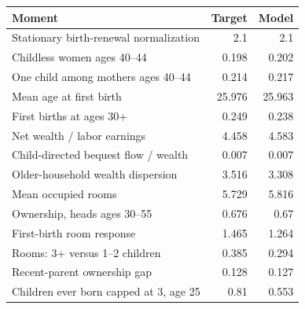 \begingroup\footnotesize
\setlength{\tabcolsep}{3pt}
\renewcommand{\arraystretch}{1.04}
\begin{tabularx}{\linewidth}{Xrr}
\toprule
Moment & Target & Model \\
\midrule
Stationary birth-renewal normalization & 2.1 & 2.1 \\
Childless women ages 40–44 & 0.198 & 0.202 \\
One child among mothers ages 40–44 & 0.214 & 0.217 \\
Mean age at first birth & 25.976 & 25.963 \\
First births at ages 30+ & 0.249 & 0.238 \\
Net wealth / labor earnings & 4.458 & 4.583 \\
Child-directed bequest flow / wealth & 0.007 & 0.007 \\
Older-household wealth dispersion & 3.516 & 3.308 \\
Mean occupied rooms & 5.729 & 5.816 \\
Ownership, heads ages 30–55 & 0.676 & 0.67 \\
First-birth room response & 1.465 & 1.264 \\
Rooms: 3+ versus 1–2 children & 0.385 & 0.294 \\
Recent-parent ownership gap & 0.128 & 0.127 \\
Children ever born capped at 3, age 25 & 0.81 & 0.553 \\
\bottomrule
\end{tabularx}
\endgroup
